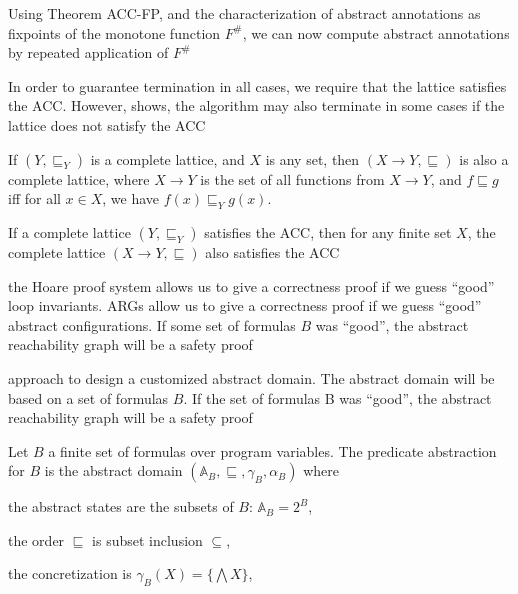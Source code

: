 \documentclass[landscape, a4paper]{article}
\begin{document}
\begin{minipage}[t]{0.2\linewidth}
\begin{betterlist}
\begin{betterlist}
		\end{betterlist}
		\item Using Theorem ACC-FP, and the characterization of abstract annotations as fixpoints of the monotone function $F^\#$, we can now compute abstract annotations by repeated application of $F^\#$
		\begin{betterlist}
			\item In order to guarantee termination in all cases, we require that the lattice satisfies the ACC. However,  shows, the algorithm may also terminate in some cases if the lattice does not satisfy the ACC
		\end{betterlist}
		\item \color{orange}If $(Y, \sqsubseteq_Y)$ is a complete lattice, and $X$ is any set, then $(X\rightarrow Y, \sqsubseteq)$ is also a complete lattice, where $X \rightarrow Y$ is the set of all functions from $X \rightarrow Y$, and $f \sqsubseteq g$ iff for all $x \in X$, we have $f(x) \sqsubseteq_Y g(x)$. \color{black}
		\item \color{orange}If a complete lattice $(Y , \sqsubseteq_Y)$ satisfies the ACC, then for any finite set $X$, the complete lattice $(X \rightarrow Y , \sqsubseteq)$ also satisfies the ACC\color{black}
	\end{betterlist}
	\fbox{Predicate Abstraction}
	\begin{betterlist}
		\item the Hoare proof system allows us to give a correctness proof if we guess \enquote{good} loop invariants. ARGs allow us to give a correctness proof if we guess \enquote{good} abstract configurations. If some set of formulas $B$ was \enquote{good}, the abstract reachability graph will be a safety proof
		\item approach to design a customized abstract domain. The abstract domain will be based on a set of formulas $B$. If the set of formulas B was \enquote{good}, the abstract reachability graph will be a safety proof
		\item \color{orange}Let $B$ a finite set of formulas over program variables. The \alert{predicate abstraction for $B$} is the abstract domain $(\mathbb{A}_B, \sqsubseteq, \gamma_B, \alpha_B)$ where
		\begin{betterlist}
			\item the abstract states are the subsets of $B$: $\mathbb{A}_B = 2^B$,
			\item the order $\sqsubseteq$ is subset inclusion $\subseteq$,
			\item the concretization is $\gamma_B(X) = \{\bigwedge X\}$,

\end{betterlist}
\end{betterlist}
\end{minipage}
\end{document}
